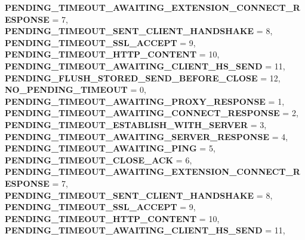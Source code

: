 \begin{DoxyCompactItemize}
\newline
{\bfseries P\+E\+N\+D\+I\+N\+G\+\_\+\+T\+I\+M\+E\+O\+U\+T\+\_\+\+A\+W\+A\+I\+T\+I\+N\+G\+\_\+\+E\+X\+T\+E\+N\+S\+I\+O\+N\+\_\+\+C\+O\+N\+N\+E\+C\+T\+\_\+\+R\+E\+S\+P\+O\+N\+SE} = 7, 
{\bfseries P\+E\+N\+D\+I\+N\+G\+\_\+\+T\+I\+M\+E\+O\+U\+T\+\_\+\+S\+E\+N\+T\+\_\+\+C\+L\+I\+E\+N\+T\+\_\+\+H\+A\+N\+D\+S\+H\+A\+KE} = 8, 
{\bfseries P\+E\+N\+D\+I\+N\+G\+\_\+\+T\+I\+M\+E\+O\+U\+T\+\_\+\+S\+S\+L\+\_\+\+A\+C\+C\+E\+PT} = 9, 
{\bfseries P\+E\+N\+D\+I\+N\+G\+\_\+\+T\+I\+M\+E\+O\+U\+T\+\_\+\+H\+T\+T\+P\+\_\+\+C\+O\+N\+T\+E\+NT} = 10, 
\newline
{\bfseries P\+E\+N\+D\+I\+N\+G\+\_\+\+T\+I\+M\+E\+O\+U\+T\+\_\+\+A\+W\+A\+I\+T\+I\+N\+G\+\_\+\+C\+L\+I\+E\+N\+T\+\_\+\+H\+S\+\_\+\+S\+E\+ND} = 11, 
{\bfseries P\+E\+N\+D\+I\+N\+G\+\_\+\+F\+L\+U\+S\+H\+\_\+\+S\+T\+O\+R\+E\+D\+\_\+\+S\+E\+N\+D\+\_\+\+B\+E\+F\+O\+R\+E\+\_\+\+C\+L\+O\+SE} = 12, 
{\bfseries N\+O\+\_\+\+P\+E\+N\+D\+I\+N\+G\+\_\+\+T\+I\+M\+E\+O\+UT} = 0, 
{\bfseries P\+E\+N\+D\+I\+N\+G\+\_\+\+T\+I\+M\+E\+O\+U\+T\+\_\+\+A\+W\+A\+I\+T\+I\+N\+G\+\_\+\+P\+R\+O\+X\+Y\+\_\+\+R\+E\+S\+P\+O\+N\+SE} = 1, 
\newline
{\bfseries P\+E\+N\+D\+I\+N\+G\+\_\+\+T\+I\+M\+E\+O\+U\+T\+\_\+\+A\+W\+A\+I\+T\+I\+N\+G\+\_\+\+C\+O\+N\+N\+E\+C\+T\+\_\+\+R\+E\+S\+P\+O\+N\+SE} = 2, 
{\bfseries P\+E\+N\+D\+I\+N\+G\+\_\+\+T\+I\+M\+E\+O\+U\+T\+\_\+\+E\+S\+T\+A\+B\+L\+I\+S\+H\+\_\+\+W\+I\+T\+H\+\_\+\+S\+E\+R\+V\+ER} = 3, 
{\bfseries P\+E\+N\+D\+I\+N\+G\+\_\+\+T\+I\+M\+E\+O\+U\+T\+\_\+\+A\+W\+A\+I\+T\+I\+N\+G\+\_\+\+S\+E\+R\+V\+E\+R\+\_\+\+R\+E\+S\+P\+O\+N\+SE} = 4, 
{\bfseries P\+E\+N\+D\+I\+N\+G\+\_\+\+T\+I\+M\+E\+O\+U\+T\+\_\+\+A\+W\+A\+I\+T\+I\+N\+G\+\_\+\+P\+I\+NG} = 5, 
\newline
{\bfseries P\+E\+N\+D\+I\+N\+G\+\_\+\+T\+I\+M\+E\+O\+U\+T\+\_\+\+C\+L\+O\+S\+E\+\_\+\+A\+CK} = 6, 
{\bfseries P\+E\+N\+D\+I\+N\+G\+\_\+\+T\+I\+M\+E\+O\+U\+T\+\_\+\+A\+W\+A\+I\+T\+I\+N\+G\+\_\+\+E\+X\+T\+E\+N\+S\+I\+O\+N\+\_\+\+C\+O\+N\+N\+E\+C\+T\+\_\+\+R\+E\+S\+P\+O\+N\+SE} = 7, 
{\bfseries P\+E\+N\+D\+I\+N\+G\+\_\+\+T\+I\+M\+E\+O\+U\+T\+\_\+\+S\+E\+N\+T\+\_\+\+C\+L\+I\+E\+N\+T\+\_\+\+H\+A\+N\+D\+S\+H\+A\+KE} = 8, 
{\bfseries P\+E\+N\+D\+I\+N\+G\+\_\+\+T\+I\+M\+E\+O\+U\+T\+\_\+\+S\+S\+L\+\_\+\+A\+C\+C\+E\+PT} = 9, 
\newline
{\bfseries P\+E\+N\+D\+I\+N\+G\+\_\+\+T\+I\+M\+E\+O\+U\+T\+\_\+\+H\+T\+T\+P\+\_\+\+C\+O\+N\+T\+E\+NT} = 10, 
{\bfseries P\+E\+N\+D\+I\+N\+G\+\_\+\+T\+I\+M\+E\+O\+U\+T\+\_\+\+A\+W\+A\+I\+T\+I\+N\+G\+\_\+\+C\+L\+I\+E\+N\+T\+\_\+\+H\+S\+\_\+\+S\+E\+ND} = 11, 

\end{DoxyCompactItemize}
